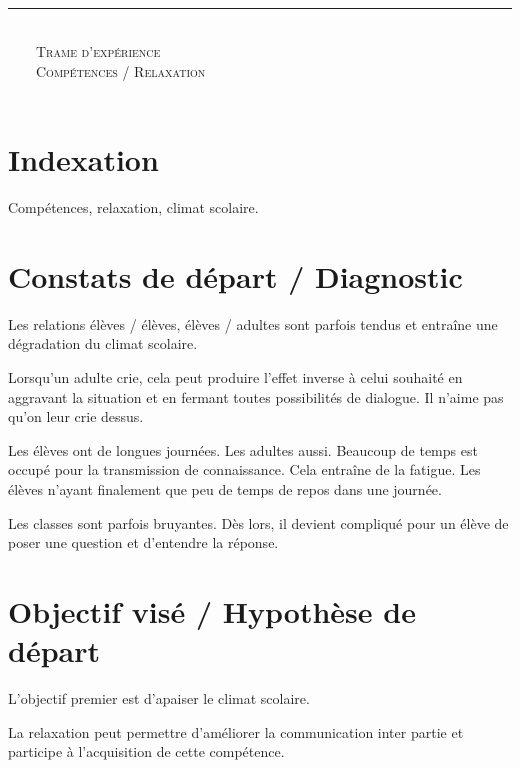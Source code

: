 \documentclass[11pt]{article}
\newcommand{\horrule}[1]{\rule{\linewidth}{#1}}
\begin{document}
	
	\begin{titlepage}
	  
	      \center
	      \horrule{2px} \\[2.5cm]
	      \textsc{\LARGE Trame d'expérience}\\[1.5cm] %
	      \textsc{\Large Compétences / Relaxation}\\[2.5cm]
	          \vfill %
	  
	\end{titlepage}
	
	\tableofcontents %
	\newpage %
	
	\section{Indexation}
	Compétences, relaxation, climat scolaire.
	
	\newpage
	
	\section{Constats de départ / Diagnostic}
	
	Les relations élèves / élèves, élèves / adultes sont parfois tendus et entraîne une dégradation du climat scolaire. 
	
	Lorsqu'un adulte crie, cela peut produire l'effet inverse à celui souhaité en aggravant la situation et en fermant toutes possibilités de dialogue. Il n'aime pas qu'on leur crie dessus.
	
	Les élèves ont de longues journées. Les adultes aussi. Beaucoup de temps est occupé pour la transmission de connaissance. Cela entraîne de la fatigue. Les élèves n'ayant finalement que peu de temps de repos dans une journée.
	
	Les classes sont parfois bruyantes. Dès lors, il devient compliqué pour un élève de poser une question et d'entendre la réponse.
	
	\newpage
	
	\section{Objectif visé / Hypothèse de départ}
	
	L'objectif premier est d'apaiser le climat scolaire. 
	
	La relaxation peut permettre d'améliorer la communication inter partie et participe à l’acquisition de cette compétence.
	
\end{document}
